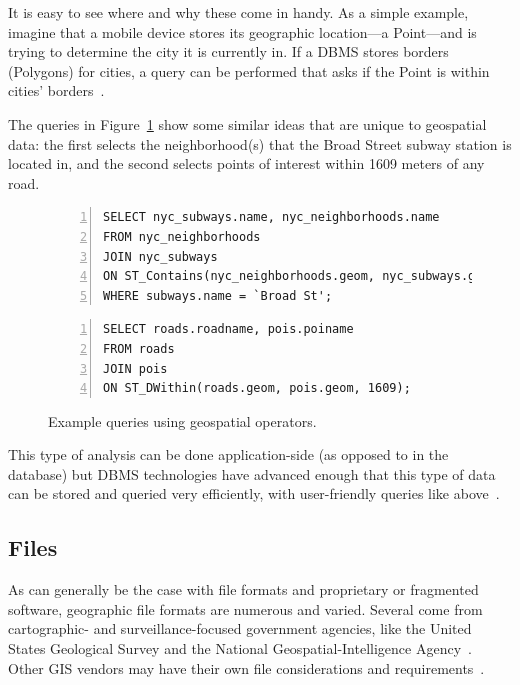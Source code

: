 It is easy to see where and why these come in handy. As a simple example, imagine that a mobile device stores its geographic location---a Point---and is trying to determine the city it is currently in. If a DBMS stores borders (Polygons) for cities, a query can be performed that asks if the Point is within cities' borders~\cite{Boundless}.

The queries in Figure~\ref{fig:spatialselect1} show some similar ideas that are unique to geospatial data: the first selects the neighborhood(s) that the Broad Street subway station is located in, and the second selects points of interest within 1609 meters of any road.

\begin{figure}
\begin{Verbatim}[samepage=true,baselinestretch=1,numbers=left,xleftmargin=12mm]
SELECT nyc_subways.name, nyc_neighborhoods.name
FROM nyc_neighborhoods
JOIN nyc_subways
ON ST_Contains(nyc_neighborhoods.geom, nyc_subways.geom)
WHERE subways.name = `Broad St';
\end{Verbatim}

\begin{Verbatim}[samepage=true,baselinestretch=1,numbers=left,xleftmargin=12mm]
SELECT roads.roadname, pois.poiname
FROM roads
JOIN pois 
ON ST_DWithin(roads.geom, pois.geom, 1609);
\end{Verbatim}
\caption{Example queries using geospatial operators.}
\label{fig:spatialselect1}
\end{figure}

This type of analysis can be done application-side (as opposed to in the database) but DBMS technologies have advanced enough that this type of data can be stored and queried very efficiently, with user-friendly queries like above~\cite{Boundless}.

\subsection{Files}
\label{background_formats}
As can generally be the case with file formats and proprietary or fragmented software, geographic file formats are numerous and varied. Several come from cartographic- and surveillance-focused government agencies, like the United States Geological Survey and the National Geospatial-Intelligence Agency~\cite{UsgsStandards}. Other GIS vendors may have their own file considerations and requirements~\cite{slashgeo,Environ1998,GeoJSON}.

